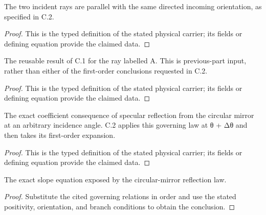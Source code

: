 \begin{definition}
  \label{def:physics:IPhO_2026_2_C_2:aux011}
  The two incident rays are parallel with the same directed incoming orientation, as specified in C.2.
\end{definition}
\begin{proof}
  This is the typed definition of the stated physical carrier; its fields or defining equation provide the claimed data.
\end{proof}

\begin{definition}
  \label{def:physics:IPhO_2026_2_C_2:aux012}
  The reusable result of C.1 for the ray labelled A. This is previous-part input, rather than either of the first-order conclusions requested in C.2.
\end{definition}
\begin{proof}
  This is the typed definition of the stated physical carrier; its fields or defining equation provide the claimed data.
\end{proof}

\begin{definition}
  \label{def:physics:IPhO_2026_2_C_2:aux013}
  The exact coefficient consequence of specular reflection from the circular mirror at an arbitrary incidence angle. C.2 applies this governing law at θ + Δθ and then takes its first-order expansion.
\end{definition}
\begin{proof}
  This is the typed definition of the stated physical carrier; its fields or defining equation provide the claimed data.
\end{proof}

\begin{lemma}
  \label{lem:physics:IPhO_2026_2_C_2:aux014}
  The exact slope equation exposed by the circular-mirror reflection law.
\end{lemma}
\begin{proof}
  Substitute the cited governing relations in order and use the stated positivity, orientation, and branch conditions to obtain the conclusion.
\end{proof}

